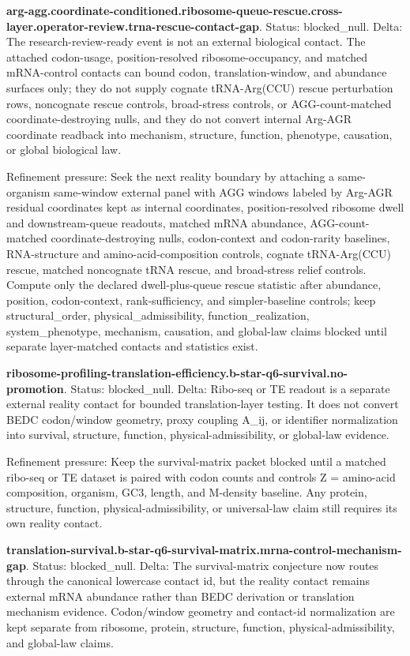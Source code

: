 \textbf{arg-agg.coordinate-conditioned.ribosome-queue-rescue.cross-layer.operator-review.trna-rescue-contact-gap}. Status: blocked\_null. Delta: The research-review-ready event is not an external biological contact. The attached codon-usage, position-resolved ribosome-occupancy, and matched mRNA-control contacts can bound codon, translation-window, and abundance surfaces only; they do not supply cognate tRNA-Arg(CCU) rescue perturbation rows, noncognate rescue controls, broad-stress controls, or AGG-count-matched coordinate-destroying nulls, and they do not convert internal Arg-AGR coordinate readback into mechanism, structure, function, phenotype, causation, or global biological law.

Refinement pressure: Seek the next reality boundary by attaching a same-organism same-window external panel with AGG windows labeled by Arg-AGR residual coordinates kept as internal coordinates, position-resolved ribosome dwell and downstream-queue readouts, matched mRNA abundance, AGG-count-matched coordinate-destroying nulls, codon-context and codon-rarity baselines, RNA-structure and amino-acid-composition controls, cognate tRNA-Arg(CCU) rescue, matched noncognate tRNA rescue, and broad-stress relief controls. Compute only the declared dwell-plus-queue rescue statistic after abundance, position, codon-context, rank-sufficiency, and simpler-baseline controls; keep structural\_order, physical\_admissibility, function\_realization, system\_phenotype, mechanism, causation, and global-law claims blocked until separate layer-matched contacts and statistics exist.

\textbf{ribosome-profiling-translation-efficiency.b-star-q6-survival.no-promotion}. Status: blocked\_null. Delta: Ribo-seq or TE readout is a separate external reality contact for bounded translation-layer testing. It does not convert BEDC codon/window geometry, proxy coupling A\_ij, or identifier normalization into survival, structure, function, physical-admissibility, or global-law evidence.

Refinement pressure: Keep the survival-matrix packet blocked until a matched ribo-seq or TE dataset is paired with codon counts and controls Z = amino-acid composition, organism, GC3, length, and M-density baseline. Any protein, structure, function, physical-admissibility, or universal-law claim still requires its own reality contact.

\textbf{translation-survival.b-star-q6-survival-matrix.mrna-control-mechanism-gap}. Status: blocked\_null. Delta: The survival-matrix conjecture now routes through the canonical lowercase contact id, but the reality contact remains external mRNA abundance rather than BEDC derivation or translation mechanism evidence. Codon/window geometry and contact-id normalization are kept separate from ribosome, protein, structure, function, physical-admissibility, and global-law claims.

